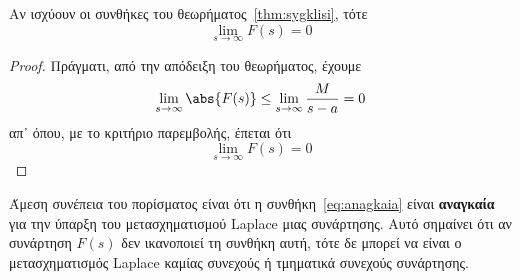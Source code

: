 \begin{cor}
  Αν ισχύουν οι συνθήκες του θεωρήματος~\ref{thm:sygklisi}, τότε
  \begin{equation}\label{eq:anagkaia}
    \lim_{s \to \infty} F(s) = 0 
  \end{equation} 
\end{cor}
\begin{proof}
  Πράγματι, από την απόδειξη του θεωρήματος, έχουμε
  \[
    \lim_{s \to \infty} \abs{F(s)} \leq \lim_{s \to \infty} \frac{M}{s-a} = 0
  \] 
  απ᾽ όπου, με το κριτήριο παρεμβολής, έπεται ότι
  \[
    \lim_{s \to \infty} F(s) = 0 
  \]
\end{proof}
\begin{rem}
  Άμεση συνέπεια του πορίσματος είναι ότι η συνθήκη~\eqref{eq:anagkaia} είναι 
  \textbf{αναγκαία} για την ύπαρξη του μετασχηματισμού Laplace μιας συνάρτησης. 
  Αυτό σημαίνει ότι αν συνάρτηση $F(s)$ δεν ικανοποιεί τη συνθήκη αυτή, τότε δε 
  μπορεί να είναι ο μετασχηματισμός Laplace καμίας συνεχούς ή τμηματικά συνεχούς 
  συνάρτησης.
\end{rem}





